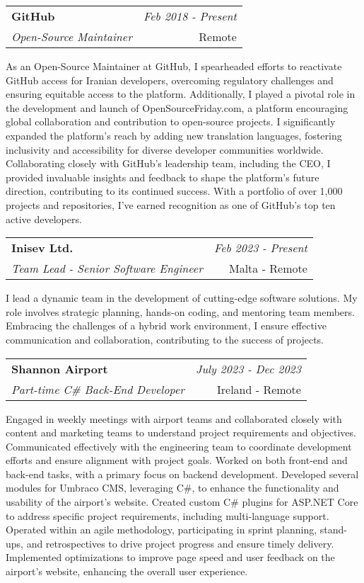 \documentclass[a4paper,10pt]{article}
\makeatletter
\newcommand{\resumeSubheading}[4]{
	\vspace{0.5mm}\item
	\begin{tabular*}{0.98\textwidth}[t]{l@{\extracolsep{\fill}}r}
		\textbf{#1} & \textit{\footnotesize{#4}} \\
		\textit{\footnotesize{#3}} &  \footnotesize{#2}\\
	\end{tabular*}
	\vspace{-2.4mm}
}
\newcommand{\resumeItemListStart}{\begin{justify}\begin{itemize}[leftmargin=3ex, rightmargin=2ex, noitemsep,labelsep=1.2mm,itemsep=0mm]\small}
\newcommand{\resumeItemListEnd}{\end{itemize}\end{justify}\vspace{-2mm}}
\makeatother
\begin{document}
\vspace{-1mm}
\resumeSubheading
{GitHub}{Remote}
{Open-Source Maintainer}{Feb 2018 - Present}
\resumeItemListStart
As an Open-Source Maintainer at GitHub, I spearheaded efforts to reactivate GitHub access for Iranian developers, overcoming regulatory challenges and ensuring equitable access to the platform. Additionally, I played a pivotal role in the development and launch of OpenSourceFriday.com, a platform encouraging global collaboration and contribution to open-source projects. I significantly expanded the platform's reach by adding new translation languages, fostering inclusivity and accessibility for diverse developer communities worldwide. Collaborating closely with GitHub's leadership team, including the CEO, I provided invaluable insights and feedback to shape the platform's future direction, contributing to its continued success. With a portfolio of over 1,000 projects and repositories, I've earned recognition as one of GitHub's top ten active developers.
\resumeItemListEnd

\vspace{-1mm}
\resumeSubheading
{Inisev Ltd.}{Malta - Remote}
{Team Lead - Senior Software Engineer}{Feb 2023 - Present}
\resumeItemListStart
I lead a dynamic team in the development of cutting-edge software solutions. My role involves strategic planning, hands-on coding, and mentoring team members. Embracing the challenges of a hybrid work environment, I ensure effective communication and collaboration, contributing to the success of projects.
\resumeItemListEnd

\vspace{-1mm}
\resumeSubheading
{Shannon Airport}{Ireland - Remote}
{Part-time C\# Back-End Developer}{July 2023 - Dec 2023}
\resumeItemListStart
Engaged in weekly meetings with airport teams and collaborated closely with content and marketing teams to understand project requirements and objectives. Communicated effectively with the engineering team to coordinate development efforts and ensure alignment with project goals. Worked on both front-end and back-end tasks, with a primary focus on backend development. Developed several modules for Umbraco CMS, leveraging C\#, to enhance the functionality and usability of the airport's website. Created custom C\# plugins for ASP.NET Core to address specific project requirements, including multi-language support. Operated within an agile methodology, participating in sprint planning, stand-ups, and retrospectives to drive project progress and ensure timely delivery. Implemented optimizations to improve page speed and user feedback on the airport's website, enhancing the overall user experience.
\resumeItemListEnd
\end{document}

